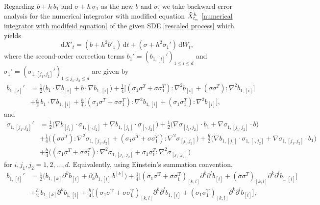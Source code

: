 \documentclass[12pt,a4paper,reqno]{amsart}
\numberwithin{equation}{section}
\begin{document}
 Regarding $b + h\,b_1$ and $\sigma + h\,\sigma_1$ as the new $b$ and $\sigma$, we take backward error analysis for the numerical integrator with modified equation $\Tilde{X}^h_{t_n}$ \eqref{numerical integrator with modifeid equation} of the given SDE \eqref{rescaled process} which yields
\begin{equation*}
    \mathrm{d} X'_t = (b + h^2 b'_1)\,\mathrm{d}t + (\sigma + h^2\sigma_1')\,\mathrm{d}W_t,
\end{equation*}
where the second-order correction terms $b_1' = (b_{1,[i]}')_{1\leq i\leq d}$ and $\sigma_1' = (\sigma_{1,[j_1,j_2]}')_{1\leq j_1,j_2\leq d}$ are given by
\begin{align*}
    b_{1,[i]}' &= \frac{1}{2}\Big( b_1\cdot \nabla b_{[i]}  + b\cdot \nabla b_{1,[i]} \Big)+
\frac{1}{4} \Big[ (\sigma_1 \sigma^T + \sigma \sigma_1^T):\nabla^2  b_{[i]} + (\sigma \sigma^T):\nabla^2 b_{1,[i]} \Big]
\\
& +\frac{h}{2}\, b_1\cdot \nabla b_{1,[i]}
+\frac{h}{4}\Big[ (\sigma_1 \sigma^T + \sigma \sigma_1^T) :\nabla^2 b_{1,[i]} + (\sigma_1 \sigma_1^T) :\nabla^2 b_{[i]} \Big],
\end{align*}
and
\begin{align*}
    \sigma_{1,[j_1,j_2]}' &= \frac{1}{2}\Big(\nabla b_{[j_1]}\cdot \sigma_{1,[\cdot,j_2]} + \nabla b_{1,[j_1]}\cdot \sigma_{[\cdot,j_2]}\Big) +\frac{1}{2}\Big(\nabla \sigma_{[j_1,j_2]}\cdot b_1 + \nabla \sigma_{1,[j_1,j_2]}\cdot b\Big) \\&+
    \frac{1}{4}\Big((\sigma\sigma^T):\nabla^2\sigma_{1,[j_1,j_2]}+(\sigma_1\sigma^T + \sigma\sigma_1^T):\nabla^2\sigma_{[j_1.j_2]}\Big) + \frac{h}{2}\Big(\nabla b_{1,[j_1]}\cdot \sigma_{1,[\cdot,j_2]} + \nabla \sigma_{1,[j_1,j_2]}\cdot b_{1}\Big)\\
    &+ \frac{h}{4}\Big((\sigma_1\sigma^T +\sigma\sigma_1^T):\nabla^2\sigma_{1,[j_1,j_2]} + \sigma_1\sigma_1^T:\nabla^2\sigma_{[j_1,j_2]}\Big)
\end{align*}
for $i,j_1,j_2 = 1,2,\dotsc,d$. Equivalently, using Einstein's summation convention,
\begin{equation*}
\begin{aligned}
b_{1,[i]}' &= \frac{1}{2}\Big( b_{1,[k]} \partial^{k} b_{[i]}  + \partial_{k} b_{1,[i]}\, b^{[k]} \Big)+
\frac{1}{4} \Big[ (\sigma_1 \sigma^{\mathrm{T}} + \sigma \sigma_1^{\mathrm{T}})_{[k,l]} \partial^{k} \partial^{l} b_{[i]} + (\sigma \sigma^T)_{[k,l]} \partial^{k} \partial^{l} b_{1,[i]} \Big]\\
& +\frac{h}{2}\,b_{1,[k]}\partial^{k} b_{1,[i]}
+\frac{h}{4}\Big[ (\sigma_1 \sigma^{\mathrm{T}} + \sigma \sigma_1^{\mathrm{T}})_{[k,l]} \partial^{k} \partial^{l} b_{1,[i]} + (\sigma_1 \sigma_1^{\mathrm{T}})_{[k,l]} \partial^{k} \partial^{l} b_{[i]} \Big], 
\end{aligned}
\end{equation*}
\end{document}
